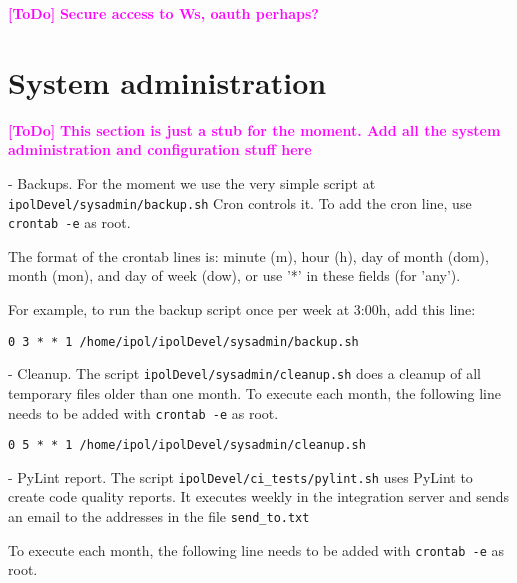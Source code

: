 \documentclass[a4paper,12pt]{article}
\newcommand{\ToDo}[1]{\textcolor{magenta}{\textbf{[ToDo]} \textbf{#1}}}
\begin{document}
\tableofcontents
\newpage
\listoffigures
\newpage












\ToDo{Secure access to Ws, oauth perhaps?}









\section{System administration}
\ToDo{This section is just a stub for the moment. Add all the system administration and configuration stuff here}

- Backups. For the moment we use the very simple script at {\tt ipolDevel/sysadmin/backup.sh}
Cron controls it. To add the cron line, use {\tt crontab -e} as root.

The format of the crontab lines is: minute (m), hour (h), day of month (dom), month (mon), and day of week (dow), or use '*' in these fields (for 'any').

For example, to run the backup script once per week at 3:00h, add this line:

{\tt 0 3 * * 1 /home/ipol/ipolDevel/sysadmin/backup.sh}

- Cleanup. The script {\tt ipolDevel/sysadmin/cleanup.sh} does a cleanup of all temporary files older than one month. To execute each month, the following line needs to be added with {\tt crontab -e} as root.

{\tt 0 5 * * 1 /home/ipol/ipolDevel/sysadmin/cleanup.sh}

- PyLint report. The script {\tt ipolDevel/ci\_tests/pylint.sh} uses PyLint to create code quality reports. It executes weekly in the integration server and sends an email to the addresses in the file {\tt send\_to.txt}

To execute each month, the following line needs to be added with {\tt crontab -e} as root.
\end{document}
